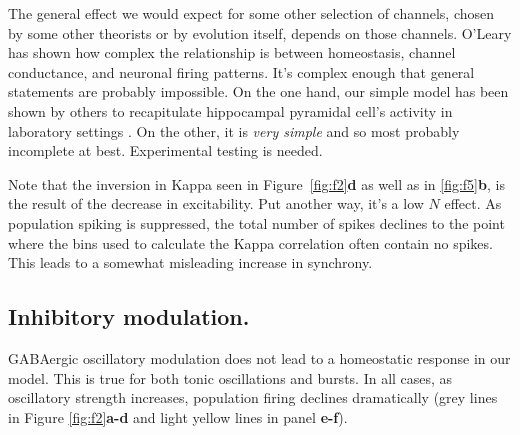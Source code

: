 \documentclass{article}
\begin{document}
The general effect we would expect for some other selection of channels, chosen by some other theorists or by evolution itself, depends on those channels. O'Leary \cite{OLeary2014} has shown how complex the relationship is between homeostasis, channel conductance, and neuronal firing patterns. It's complex enough that general statements are probably impossible. On the one hand, our simple model has been shown by others to recapitulate hippocampal pyramidal cell's activity in laboratory settings \cite{LeMasson1993}. On the other, it is \textit{very simple} and so most probably incomplete at best. Experimental testing is needed. 

Note that the inversion in Kappa seen in Figure~\ref{fig:f2}\textbf{d} as well as in \ref{fig:f5}\textbf{b}, is the result of the decrease in excitability. Put another way, it's a low $N$ effect. As population spiking is suppressed, the total number of spikes declines to the point where the bins used to calculate the Kappa correlation often contain no spikes. This leads to a somewhat misleading increase in synchrony.

\subsection*{Inhibitory modulation.}
GABAergic oscillatory modulation does not lead to a homeostatic response in our model. This is true for both tonic oscillations and bursts. In all cases, as oscillatory strength increases, population firing declines dramatically (grey lines in Figure \ref{fig:f2}\textbf{a-d} and light yellow lines in panel \textbf{e-f}).
\end{document}
